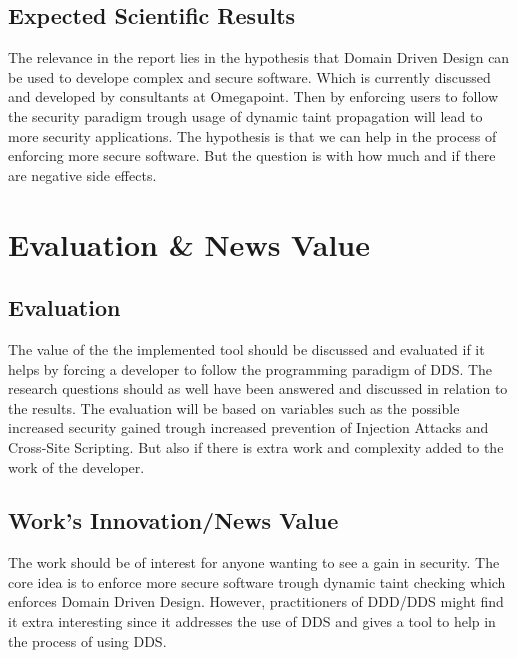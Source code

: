 \documentclass{../kththesis}
\begin{document}
\section{Expected Scientific Results}
The relevance in the report lies in the hypothesis that Domain Driven Design can be used to develope complex and secure software. Which is currently discussed and developed by consultants at Omegapoint. Then by enforcing users to follow the security paradigm trough usage of dynamic taint propagation will lead to more security applications. The hypothesis is that we can help in the process of enforcing more secure software. But the question is with how much and if there are negative side effects.



\chapter{Evaluation \& News Value}
\section{Evaluation}
The value of the the implemented tool should be discussed and evaluated if it helps by forcing a developer to follow the programming paradigm of DDS. The research questions should as well have been answered and discussed in relation to the results. The evaluation will be based on variables such as the possible increased security gained trough increased prevention of Injection Attacks and Cross-Site Scripting. But also if there is extra work and complexity added to the work of the developer.


\section{Work's Innovation/News Value}
The work should be of interest for anyone wanting to see a gain in security. The core idea is to enforce more secure software trough dynamic taint checking which enforces Domain Driven Design. However, practitioners of DDD/DDS might find it extra interesting since it addresses the use of DDS and gives a tool to help in the process of using DDS.
\end{document}
